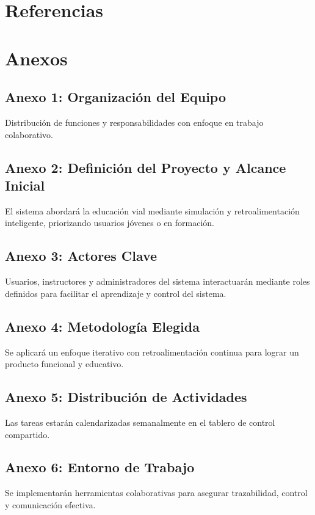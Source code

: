 \documentclass[12pt]{article}
\begin{document}
\section{Referencias}
\printbibliography

\section*{Anexos}

\subsection*{Anexo 1: Organización del Equipo}
Distribución de funciones y responsabilidades con enfoque en trabajo colaborativo.

\subsection*{Anexo 2: Definición del Proyecto y Alcance Inicial}
El sistema abordará la educación vial mediante simulación y retroalimentación inteligente, priorizando usuarios jóvenes o en formación.

\subsection*{Anexo 3: Actores Clave}
Usuarios, instructores y administradores del sistema interactuarán mediante roles definidos para facilitar el aprendizaje y control del sistema.

\subsection*{Anexo 4: Metodología Elegida}
Se aplicará un enfoque iterativo con retroalimentación continua para lograr un producto funcional y educativo.

\subsection*{Anexo 5: Distribución de Actividades}
Las tareas estarán calendarizadas semanalmente en el tablero de control compartido.

\subsection*{Anexo 6: Entorno de Trabajo}
Se implementarán herramientas colaborativas para asegurar trazabilidad, control y comunicación efectiva.
\end{document}

